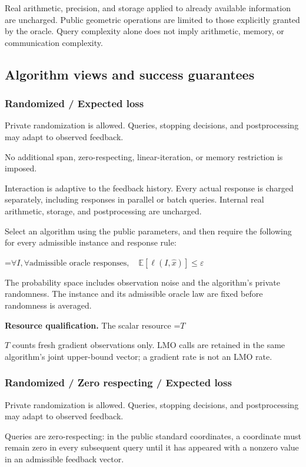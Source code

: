 \documentclass[10pt,a4paper]{article}
\newcommand{\AtlasMath}[1]{\par\begingroup\centering\setbox0=\hbox{$\displaystyle #1$}\ifdim\wd0>1.4\linewidth\typeout{ATLAS WIDE FORMULA: \the\wd0}\fi\ifdim\wd0>\linewidth\resizebox{\linewidth}{!}{\box0}\else\box0\fi\par\endgroup}
\newcommand{\AtlasInlineMath}[1]{\begingroup\setbox0=\hbox{$#1$}\ifdim\wd0>.4\linewidth\endgroup\AtlasMath{#1}\else\endgroup$#1$\fi}
\begin{document}
Real arithmetic, precision, and storage applied to already available information are uncharged. Public geometric operations are limited to those explicitly granted by the oracle. Query complexity alone does not imply arithmetic, memory, or communication complexity.

\subsection{Algorithm views and success guarantees}
\subsubsection{Randomized / Expected loss}
Private randomization is allowed. Queries, stopping decisions, and postprocessing may adapt to observed feedback.

No additional span, zero-respecting, linear-iteration, or memory restriction is imposed.

Interaction is adaptive to the feedback history. Every actual response is charged separately, including responses in parallel or batch queries. Internal real arithmetic, storage, and postprocessing are uncharged.

Select an algorithm using the public parameters, and then require the following for every admissible instance and response rule:


\AtlasMath{\forall I,\forall\text{admissible oracle responses},\quad\mathbb{E}[\ell(I,\widehat{x})]\le\varepsilon}


The probability space includes observation noise and the algorithm's private randomness. The instance and its admissible oracle law are fixed before randomness is averaged.

\textbf{Resource qualification.} The scalar resource \AtlasInlineMath{T} counts fresh gradient observations only. LMO calls are retained in the same algorithm's joint upper-bound vector; a gradient rate is not an LMO rate.

\subsubsection{Randomized / Zero respecting / Expected loss}
Private randomization is allowed. Queries, stopping decisions, and postprocessing may adapt to observed feedback.

Queries are zero-respecting: in the public standard coordinates, a coordinate must remain zero in every subsequent query until it has appeared with a nonzero value in an admissible feedback vector.
\end{document}
